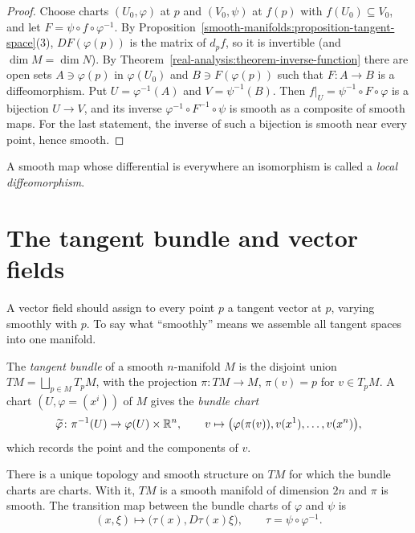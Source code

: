 \begin{proof}
Choose charts $(U_0, \varphi)$ at $p$ and $(V_0, \psi)$ at $f(p)$ with $f(U_0) \subseteq V_0$, and let $F = \psi \circ f \circ \varphi^{-1}$. By
Proposition~\ref{smooth-manifolds:proposition-tangent-space}(3), $DF(\varphi(p))$ is the matrix of $d_pf$, so it is invertible (and $\dim M = \dim N$). By
Theorem~\ref{real-analysis:theorem-inverse-function} there are open sets $A \ni \varphi(p)$ in $\varphi(U_0)$ and $B \ni F(\varphi(p))$ such that
$F \colon A \to B$ is a diffeomorphism. Put $U = \varphi^{-1}(A)$ and $V = \psi^{-1}(B)$. Then $f|_U = \psi^{-1} \circ F \circ \varphi$ is a bijection $U \to V$,
and its inverse $\varphi^{-1} \circ F^{-1} \circ \psi$ is smooth as a composite of smooth maps. For the last statement, the inverse of such a bijection is
smooth near every point, hence smooth.
\end{proof}

A smooth map whose differential is everywhere an isomorphism is called a \emph{local diffeomorphism}.

\section{The tangent bundle and vector fields}\label{smooth-manifolds:section-vector-fields}

A vector field should assign to every point $p$ a tangent vector at $p$, varying smoothly with $p$. To say what ``smoothly'' means we assemble all tangent
spaces into one manifold.

\begin{definition}\label{smooth-manifolds:definition-tangent-bundle}
The \emph{tangent bundle} of a smooth $n$-manifold $M$ is the disjoint union $TM = \bigsqcup_{p \in M}T_pM$, with the projection $\pi \colon TM \to M$,
$\pi(v) = p$ for $v \in T_pM$. A chart $(U, \varphi = (x^i))$ of $M$ gives the \emph{bundle chart}
\[
\widetilde{\varphi} \colon \pi^{-1}(U) \to \varphi(U) \times \mathbb{R}^n, \qquad v \mapsto \bigl(\varphi(\pi(v)), v(x^1), \ldots, v(x^n)\bigr),
\]
which records the point and the components of $v$.
\end{definition}

\begin{proposition}\label{smooth-manifolds:proposition-tangent-bundle}
There is a unique topology and smooth structure on $TM$ for which the bundle charts are charts. With it, $TM$ is a smooth manifold of dimension $2n$ and
$\pi$ is smooth. The transition map between the bundle charts of $\varphi$ and $\psi$ is
\[
(x, \xi) \mapsto \bigl(\tau(x), D\tau(x)\xi\bigr), \qquad \tau = \psi \circ \varphi^{-1}.
\]
\end{proposition}

